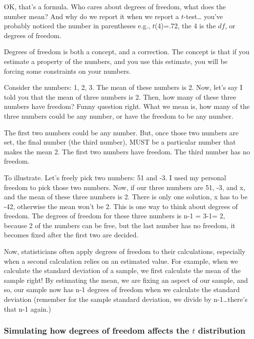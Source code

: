 \documentclass[
  letterpaper,
  DIV=11,
  numbers=noendperiod]{scrreprt}
\begin{document}
OK, that's a formula. Who cares about degrees of freedom, what does the
number mean? And why do we report it when we report a \(t\)-test\ldots{}
you've probably noticed the number in parentheses e.g., \(t\)(4)=.72,
the 4 is the \(df\), or degrees of freedom.

Degrees of freedom is both a concept, and a correction. The concept is
that if you estimate a property of the numbers, and you use this
estimate, you will be forcing some constraints on your numbers.

Consider the numbers: 1, 2, 3. The mean of these numbers is 2. Now,
let's say I told you that the mean of three numbers is 2. Then, how many
of these three numbers have freedom? Funny question right. What we mean
is, how many of the three numbers could be any number, or have the
freedom to be any number.

The first two numbers could be any number. But, once those two numbers
are set, the final number (the third number), MUST be a particular
number that makes the mean 2. The first two numbers have freedom. The
third number has no freedom.

To illustrate. Let's freely pick two numbers: 51 and -3. I used my
personal freedom to pick those two numbers. Now, if our three numbers
are 51, -3, and x, and the mean of these three numbers is 2. There is
only one solution, x has to be -42, otherwise the mean won't be 2. This
is one way to think about degrees of freedom. The degrees of freedom for
these three numbers is n-1 = 3-1= 2, because 2 of the numbers can be
free, but the last number has no freedom, it becomes fixed after the
first two are decided.

Now, statisticians often apply degrees of freedom to their calculations,
especially when a second calculation relies on an estimated value. For
example, when we calculate the standard deviation of a sample, we first
calculate the mean of the sample right! By estimating the mean, we are
fixing an aspect of our sample, and so, our sample now has n-1 degrees
of freedom when we calculate the standard deviation (remember for the
sample standard deviation, we divide by n-1\ldots there's that n-1
again.)

\subsubsection{\texorpdfstring{Simulating how degrees of freedom affects
the \(t\)
distribution}{Simulating how degrees of freedom affects the t distribution}}\label{simulating-how-degrees-of-freedom-affects-the-t-distribution}
\end{document}
